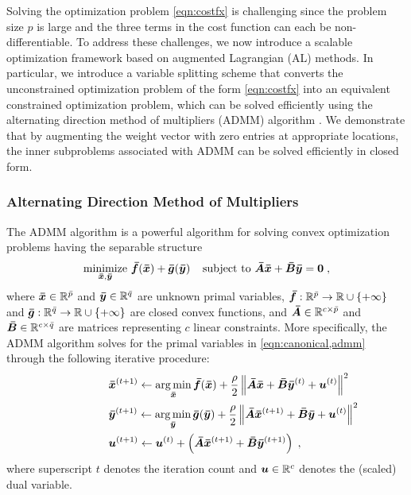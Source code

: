 Solving the optimization problem \eqref{eqn:costfx} is challenging since the problem size $p$ is large and the three terms {in the cost function} can each be \mbox{non-differentiable}.
To address these challenges, we now introduce a scalable optimization framework based on augmented Lagrangian (AL) methods.
In particular, we introduce a variable splitting scheme that converts the unconstrained optimization problem of the form \eqref{eqn:costfx} into an equivalent constrained optimization problem, which can be solved efficiently using the alternating direction method of multipliers (ADMM) algorithm \citep{Boyd:2011,Glowinski:1975, Gabay:1976}. 
We demonstrate that by augmenting the weight vector with zero entries at appropriate locations, the inner subproblems associated with ADMM can be solved efficiently in closed form.

\subsubsection{Alternating Direction Method of Multipliers}
The ADMM algorithm is a powerful algorithm for solving convex optimization problems having the separable structure \citep{Boyd:2011}
\begin{equation}
	\operatorname*{minimize}_{{\bm{\bar{x}}},{\bm{\bar{y}}}}\,{\bm{\bar{f}}}({\bm{\bar{x}}}) + {\bm{\bar{g}}}({\bm{\bar{y}}}) \;\;\;\; 
	\text{subject to } {\ensuremath{\bm{\bar{A}}}}{\ensuremath{\bm{\bar{x}}}}+{\bm{\bar{B}}}{\bm{\bar{y}}}={\bm{0}} \;,
	\label{eqn:canonical,admm}
\end{equation}
where ${\bm{\bar{x}}}\in\mathbb{R}^{\bar{p}}$ and ${\bm{\bar{y}}}\in\mathbb{R}^{\bar{q}}$ are unknown primal variables, ${\bm{\bar{f}}}:\mathbb{R}^{\bar{p}}\to\mathbb{R}\cup\{+\infty\}$ and ${\bm{\bar{g}}}:\mathbb{R}^{\bar{q}}\to\mathbb{R}\cup\{+\infty\}$ are closed convex functions, and ${\bm{\bar{A}}}\in\mathbb{R}^{c\times {\ensuremath{\bar{p}}}}$ and ${\bm{\bar{B}}}\in\mathbb{R}^{c\times {\ensuremath{\bar{q}}}}$ are matrices representing $c$ linear constraints.  
More specifically, the ADMM algorithm solves for the primal variables in \eqref{eqn:canonical,admm} through the following iterative procedure:
\begin{align}
	&\hspace{0.17\linewidth}\xbar\iterp\leftarrow\displaystyle\argmin{\xbar} \fbar(\xbar) + \frac{\rho}{2}\norm{\Abar\xbar + \Bbar\ybar\iter + \u\iter}^2 \label{eqn:admm,xbar,update}\\ 
	&\hspace{0.17\linewidth}\ybar\iterp\leftarrow\displaystyle\argmin{\ybar} \gbar(\ybar) + \frac{\rho}{2}\norm{\Abar\xbar\iterp + \Bbar\ybar + \u\iter}^2 \label{eqn:admm,ybar,update}\\ 
	&\hspace{0.17\linewidth}\u\iterp\leftarrow \u\iter+ \left(\Abar\xbar\iterp+\Bbar\ybar\iterp\right)  \; , & \label{eqn:admm,dual,update}
\end{align}
where superscript $t$ denotes the iteration count and ${\bm{u}}\in\mathbb{R}^c$ denotes the (scaled) dual variable.

